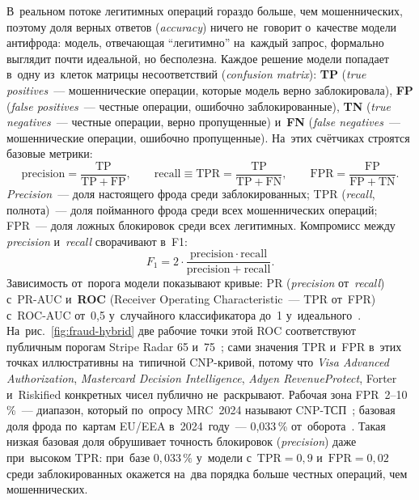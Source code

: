 В~реальном потоке легитимных операций гораздо больше, чем мошеннических,
поэтому доля верных ответов (\textit{accuracy}) ничего не~говорит о~качестве
модели антифрода: модель, отвечающая \enquote{легитимно} на~каждый запрос,
формально выглядит почти идеальной, но бесполезна. Каждое решение модели
попадает в~одну из~клеток матрицы несоответствий (\textit{confusion
matrix}): \textbf{TP} (\textit{true positives}~--- мошеннические операции,
которые модель верно заблокировала), \textbf{FP} (\textit{false positives}~---
честные операции, ошибочно заблокированные), \textbf{TN} (\textit{true
negatives}~--- честные операции, верно пропущенные) и~\textbf{FN}
(\textit{false negatives}~--- мошеннические операции, ошибочно пропущенные).
На~этих счётчиках строятся базовые метрики:
\[
  \mathrm{precision} = \frac{\mathrm{TP}}{\mathrm{TP} + \mathrm{FP}},
  \qquad
  \mathrm{recall} \equiv \mathrm{TPR} = \frac{\mathrm{TP}}{\mathrm{TP} + \mathrm{FN}},
  \qquad
  \mathrm{FPR} = \frac{\mathrm{FP}}{\mathrm{FP} + \mathrm{TN}}.
\]
\textit{Precision}~--- доля настоящего фрода среди заблокированных; TPR
(\textit{recall}, полнота)~--- доля пойманного фрода среди всех мошеннических
операций; FPR~--- доля ложных блокировок среди всех легитимных. Компромисс
между \textit{precision} и~\textit{recall} сворачивают в~F1:
\[
  F_1 = 2 \cdot \frac{\mathrm{precision} \cdot \mathrm{recall}}
  {\mathrm{precision} + \mathrm{recall}}.
\]
Зависимость от~порога модели показывают кривые: PR (\textit{precision}
от~\textit{recall}) с~PR-AUC и~\textbf{ROC} (Receiver Operating
Characteristic~--- TPR от~FPR) с~ROC-AUC от~0,5 у~случайного классификатора
до~1
у~идеального~\cite{sklearn-classification-metrics,roc-pr-imbalanced-2024}.
На~рис.~\ref{fig:fraud-hybrid} две рабочие точки этой ROC соответствуют
публичным порогам Stripe Radar 65 и~75~\cite{stripe-radar-risk-evaluation};
сами значения TPR и~FPR в~этих точках иллюстративны на~типичной CNP-кривой,
потому что \textit{Visa Advanced Authorization}, \textit{Mastercard Decision
Intelligence}, \textit{Adyen RevenueProtect}, Forter и~Riskified конкретных
чисел публично не~раскрывают. Рабочая зона FPR~2--10\,\%~--- диапазон,
который по~опросу MRC~2024 называют CNP-ТСП~\cite{mrc-fraud-report-2024};
базовая доля фрода по~картам EU/EEA в~2024~году~--- 0,033\,\%
от~оборота~\cite{ecb-eba-payment-fraud-2025}. Такая низкая базовая доля
обрушивает точность блокировок (\textit{precision}) даже при~высоком TPR:
при~базе $0{,}033\,\%$ у~модели с~$\mathrm{TPR}=0{,}9$
и~$\mathrm{FPR}=0{,}02$ среди заблокированных окажется на~два порядка больше
честных операций, чем мошеннических.

